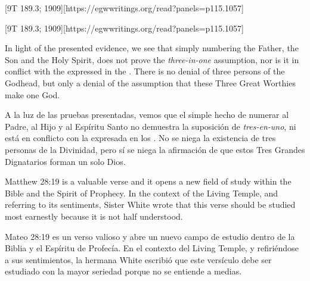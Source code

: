 [9T 189.3; 1909][https://egwwritings.org/read?panels=p115.1057]


[9T 189.3; 1909][https://egwwritings.org/read?panels=p115.1057]


In light of the presented evidence, we see that simply numbering the Father, the Son and the Holy Spirit, does not prove the \textit{three-in-one} assumption, nor is it in conflict with the  expressed in the . There is no denial of three persons of the Godhead, but only a denial of the assumption that these Three Great Worthies make one God.


A la luz de las pruebas presentadas, vemos que el simple hecho de numerar al Padre, al Hijo y al Espíritu Santo no demuestra la suposición de \textit{tres-en-uno}, ni está en conflicto con la  expresada en los . No se niega la existencia de tres personas de la Divinidad, pero sí se niega la afirmación de que estos Tres Grandes Dignatarios forman un solo Dios.


Matthew 28:19 is a valuable verse and it opens a new field of study within the Bible and the Spirit of Prophecy. In the context of the Living Temple, and referring to its sentiments, Sister White wrote that this verse should be studied most earnestly because it is not half understood.


Mateo 28:19 es un verso valioso y abre un nuevo campo de estudio dentro de la Biblia y el Espíritu de Profecía. En el contexto del Living Temple, y refiriéndose a sus sentimientos, la hermana White escribió que este versículo debe ser estudiado con la mayor seriedad porque no se entiende a medias.


